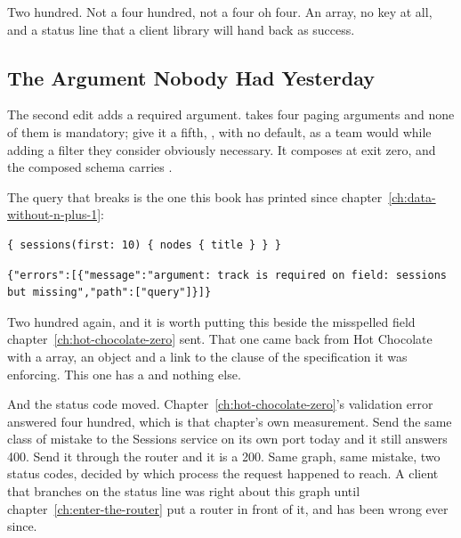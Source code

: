 %
Two hundred. Not a four hundred, not a four oh four. An  array,
no  key at all, and a status line that a client library will hand
back as success.

\subsection{The Argument Nobody Had Yesterday}

%
The second edit adds a required argument.  takes four paging
arguments and none of them is mandatory; give it a fifth, , with no default, as a team would while adding a filter they consider
obviously necessary. It composes at exit zero, and the composed schema carries
.

%
The query that breaks is the one this book has printed since
chapter~\ref{ch:data-without-n-plus-1}:

\begin{verbatim}
{ sessions(first: 10) { nodes { title } } }
\end{verbatim}

\begin{verbatim}
{"errors":[{"message":"argument: track is required on field: sessions but missing","path":["query"]}]}
\end{verbatim}

%
Two hundred again, and it is worth putting this beside the misspelled field
chapter~\ref{ch:hot-chocolate-zero} sent. That one came back from Hot
Chocolate with a  array, an  object and a
link to the clause of the specification it was enforcing. This one has a
 and nothing else.

%
And the status code moved. Chapter~\ref{ch:hot-chocolate-zero}'s validation
error answered four hundred, which is that chapter's own measurement. Send the
same class of mistake to the Sessions service on its own port today and it
still answers 400. Send it through the router and it is a 200. Same graph,
same mistake, two status codes, decided by which process the request happened
to reach. A client that branches on the status line was right about this graph
until chapter~\ref{ch:enter-the-router} put a router in front of it, and has
been wrong ever since.

